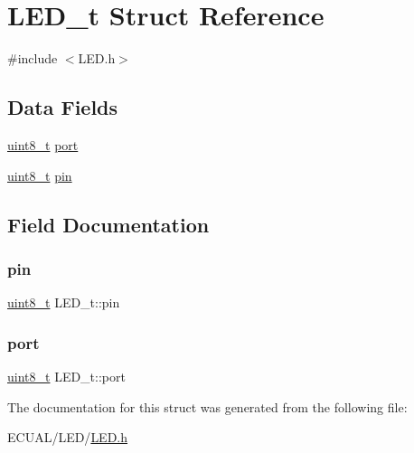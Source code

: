 \hypertarget{struct_l_e_d__t}{}\section{L\+E\+D\+\_\+t Struct Reference}
\label{struct_l_e_d__t}


{\ttfamily \#include $<$L\+E\+D.\+h$>$}

\subsection*{Data Fields}
\begin{DoxyCompactItemize}
\item 
\hyperlink{_typedef_8h_aba7bc1797add20fe3efdf37ced1182c5}{uint8\+\_\+t} \hyperlink{struct_l_e_d__t_a4cd3fe209df3d40bd2994a6cfc0e26a2}{port}
\item 
\hyperlink{_typedef_8h_aba7bc1797add20fe3efdf37ced1182c5}{uint8\+\_\+t} \hyperlink{struct_l_e_d__t_a67419744c216cc88b5bdf12cccb50e2b}{pin}
\end{DoxyCompactItemize}


\subsection{Field Documentation}
\mbox{\label{struct_l_e_d__t_a67419744c216cc88b5bdf12cccb50e2b}} 
\subsubsection{\texorpdfstring{pin}{pin}}
{\footnotesize\ttfamily \hyperlink{_typedef_8h_aba7bc1797add20fe3efdf37ced1182c5}{uint8\+\_\+t} L\+E\+D\+\_\+t\+::pin}

\mbox{\label{struct_l_e_d__t_a4cd3fe209df3d40bd2994a6cfc0e26a2}} 
\subsubsection{\texorpdfstring{port}{port}}
{\footnotesize\ttfamily \hyperlink{_typedef_8h_aba7bc1797add20fe3efdf37ced1182c5}{uint8\+\_\+t} L\+E\+D\+\_\+t\+::port}



The documentation for this struct was generated from the following file\+:\begin{DoxyCompactItemize}
\item 
E\+C\+U\+A\+L/\+L\+E\+D/\hyperlink{_l_e_d_8h}{L\+E\+D.\+h}\end{DoxyCompactItemize}
